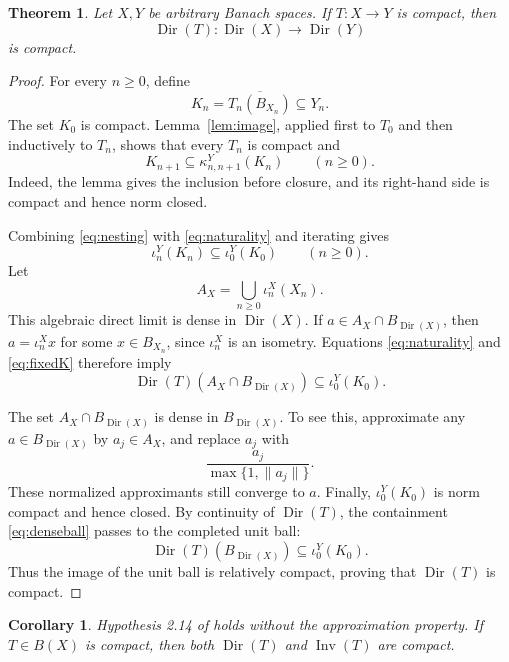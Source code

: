 \documentclass[11pt]{article}
\newtheorem{theorem}{Theorem}
\newtheorem{corollary}{Corollary}
\newcommand{\Dir}{\operatorname{Dir}}
\newcommand{\Inv}{\operatorname{Inv}}
\begin{document}
\begin{theorem}\label{thm:main}
Let \(X,Y\) be arbitrary Banach spaces. If \(T:X\to Y\) is compact, then
\[
 \Dir(T):\Dir(X)\longrightarrow\Dir(Y)
\]
is compact.
\end{theorem}

\begin{proof}
For every \(n\geq0\), define
\[
 K_n=\overline{T_n(B_{X_n})}\subseteq Y_n.
\]
The set \(K_0\) is compact. Lemma~\ref{lem:image}, applied first to \(T_0\)
and then inductively to \(T_n\), shows that every \(T_n\) is compact and
\begin{equation}\label{eq:nesting}
 K_{n+1}\subseteq \kappa^Y_{n,n+1}(K_n)
 \qquad(n\geq0).
\end{equation}
Indeed, the lemma gives the inclusion before closure, and its right-hand side
is compact and hence norm closed.

Combining \eqref{eq:nesting} with \eqref{eq:naturality} and iterating gives
\begin{equation}\label{eq:fixedK}
 \iota_n^Y(K_n)\subseteq \iota_0^Y(K_0)
 \qquad(n\geq0).
\end{equation}
Let
\[
 A_X=\bigcup_{n\geq0}\iota_n^X(X_n).
\]
This algebraic direct limit is dense in \(\Dir(X)\). If
\(a\in A_X\cap B_{\Dir(X)}\), then \(a=\iota_n^X x\) for some
\(x\in B_{X_n}\), since \(\iota_n^X\) is an isometry. Equations
\eqref{eq:naturality} and \eqref{eq:fixedK} therefore imply
\begin{equation}\label{eq:denseball}
 \Dir(T)(A_X\cap B_{\Dir(X)})\subseteq \iota_0^Y(K_0).
\end{equation}

The set \(A_X\cap B_{\Dir(X)}\) is dense in \(B_{\Dir(X)}\). To see this,
approximate any \(a\in B_{\Dir(X)}\) by \(a_j\in A_X\), and replace
\(a_j\) with
\[
 \frac{a_j}{\max\{1,\lVert a_j\rVert\}}.
\]
These normalized approximants still converge to \(a\). Finally,
\(\iota_0^Y(K_0)\) is norm compact and hence closed. By continuity of
\(\Dir(T)\), the containment \eqref{eq:denseball} passes to the completed
unit ball:
\[
 \Dir(T)(B_{\Dir(X)})\subseteq \iota_0^Y(K_0).
\]
Thus the image of the unit ball is relatively compact, proving that
\(\Dir(T)\) is compact.
\end{proof}

\begin{corollary}
Hypothesis 2.14 of \cite{source} holds without the approximation property. If
\(T\in B(X)\) is compact, then both \(\Dir(T)\) and \(\Inv(T)\) are compact.
\end{corollary}
\end{document}

